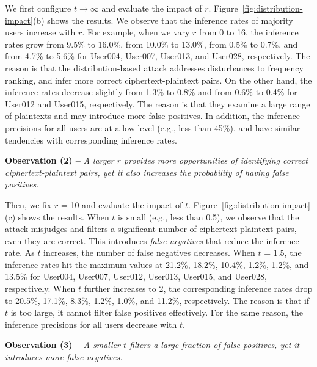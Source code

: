 \documentclass[bachelor]{thesis-uestc}
\begin{document}
We first configure $t \rightarrow \infty$ and evaluate the impact of $r$. Figure~\ref{fig:distribution-impact}(b) shows the results. We observe that the
inference rates of majority users increase with $r$. For example, when we vary
$r$ from 0 to 16, the inference rates grow from 9.5\% to 16.0\%, from 10.0\%
to 13.0\%, from 0.5\% to 0.7\%, and from 4.7\% to 5.6\% for User004, User007,
User013, and User028, respectively. The reason is that the distribution-based
attack addresses disturbances to frequency ranking, and infer more correct
ciphertext-plaintext  pairs. On the other hand, the inference rates decrease
slightly from 1.3\% to 0.8\% and from 0.6\% to 0.4\% for User012 and User015,
respectively. The reason is that they examine a large range of plaintexts and
may introduce more false positives. In addition, the inference precisions for
all users are  at a low level (e.g., less than 45\%), and have similar
tendencies with corresponding inference rates.  

{\bf Observation (2) --} {\em A larger $r$ provides more opportunities of
identifying correct ciphertext-plaintext pairs, yet it also increases the
probability of having false positives.}   

Then, we fix $r$ = 10 and evaluate the impact of $t$. 
Figure~\ref{fig:distribution-impact}(c) shows the results. When $t$ is small
(e.g., less than 0.5), we observe that the attack misjudges and filters a
significant number of ciphertext-plaintext pairs, even they are correct. This
introduces {\em false negatives} that reduce the inference rate. As $t$
increases, the number of false negatives decreases.  When $t$ = 1.5, the
inference rates hit the maximum values at 21.2\%, 18.2\%, 10.4\%, 1.2\%,
1.2\%, and 13.5\% for User004, User007, User012, User013, User015, and
User028, respectively. When $t$ further increases to 2, the corresponding
inference rates drop to 20.5\%, 17.1\%, 8.3\%, 1.2\%, 1.0\%, and 11.2\%,
respectively. The reason is that if $t$ is too large, it cannot filter false
positives effectively. For the same reason, the inference precisions for all
users decrease with $t$.  



{\bf Observation (3) --} {\em A smaller $t$ filters a large fraction of false
positives, yet it introduces more false negatives.}   
\end{document}
